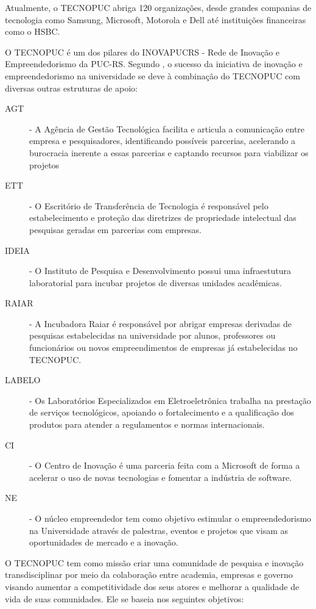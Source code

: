 Atualmente, o TECNOPUC abriga 120 organizações, desde grandes companias de tecnologia como Samsung, Microsoft, Motorola e Dell até instituições financeiras como o HSBC. 

O TECNOPUC é um dos pilares do INOVAPUCRS - Rede de Inovação e Empreendedorismo da PUC-RS. Segundo , o sucesso da iniciativa de inovação e empreendedorismo na universidade se deve à combinação do TECNOPUC com diversas outras estruturas de apoio:

\begin{description}
\item[AGT] - A Agência de Gestão Tecnológica facilita e articula a comunicação entre empresa e pesquisadores, identificando possíveis parcerias, acelerando a burocracia inerente a essas parcerias e captando recursos para viabilizar os projetos
\item[ETT] - O Escritório de Transferência de Tecnologia é responsável pelo estabelecimento e proteção das diretrizes de propriedade intelectual das pesquisas geradas em parcerias com empresas.
\item[IDEIA] - O Instituto de Pesquisa e Desenvolvimento possui uma infraestutura laboratorial para incubar projetos de diversas unidades acadêmicas.
\item[RAIAR] - A Incubadora Raiar é responsável por abrigar empresas derivadas de pesquisas estabelecidas na universidade por alunos, professores ou funcionários ou novos empreendimentos de empresas já estabelecidas no TECNOPUC.
\item[LABELO] - Os Laboratórios Especializados em Eletroeletrônica trabalha na prestação de serviços tecnológicos, apoiando o fortalecimento e a qualificação dos produtos para atender a regulamentos e normas internacionais.
\item[CI] - O Centro de Inovação é uma parceria feita com a Microsoft de forma a acelerar o uso de novas tecnologias e fomentar a indústria de software.
\item[NE] - O núcleo empreendedor tem como objetivo estimular o empreendedorismo na Universidade através de palestras, eventos e projetos que visam as oportunidades de mercado e a inovação.
\end{description}

O TECNOPUC tem como missão criar uma comunidade de pesquisa e inovação transdisciplinar por meio da colaboração entre academia, empresas e governo visando aumentar a competitividade dos seus atores e melhorar a qualidade de vida de suas comunidades. Ele se baseia nos seguintes objetivos:


